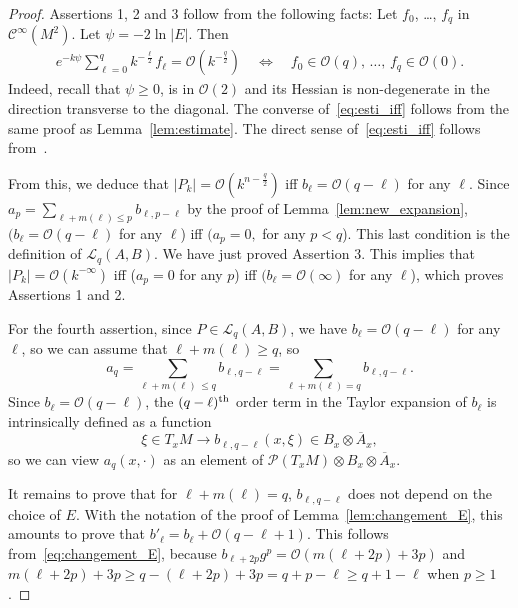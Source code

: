 \documentclass[10pt,a4paper]{article}
\theoremstyle{definition}
\numberwithin{equation}{section}
\newcommand{\con}{\overline}
\newcommand{\Ci}{{\mathcal{C}}^{\infty}}
\newcommand{\bigo}{\mathcal{O}}
\newcommand{\lag}{\mathcal{L}}
\newcommand{\pol}{\mathcal{P}}
\begin{document}
\begin{proof}
Assertions 1, 2 and 3 follow from the following facts: Let $f_0$, \ldots, $f_q$ in $\Ci (M^2)$. Let $\psi = -2
\ln |E|$. Then
\begin{gather}\label{eq:esti_iff}
e^{-k \psi} \sum_{\ell =0}^q k^{-\frac{\ell}{2}} f_{\ell} = \bigo \left(k^{-\frac{q}{2}}\right) \quad \Leftrightarrow \quad f_0 \in \bigo (q),\, \ldots,\, f_q \in \bigo (0).
\end{gather}
Indeed, recall that $\psi \geqslant 0 $, is in $\bigo (2)$ and its Hessian is non-degenerate in the direction transverse to the diagonal. The converse of~\eqref{eq:esti_iff} follows from the same proof as Lemma~\ref{lem:estimate}. The direct sense of~\eqref{eq:esti_iff} follows from~\cite[Proposition~2.4 and Remark~2.5]{oim}.


From this, we deduce that $|P_k | = \bigo (k^{n -\frac{q}{2}})$ iff $b_{\ell} = \bigo (q-\ell)$ for any $\ell$. Since $a_{p} = \sum_{\ell + m (\ell) \leqslant p} b_{\ell, p -\ell}$ by the proof of Lemma~\ref{lem:new_expansion}, $(b_\ell = \bigo (q-\ell)$ for any $\ell$) iff $(a_p = 0,$ for any $p < q$). This last condition is the definition of $\lag _q (A,B)$. We have just proved Assertion 3. This implies that $|P_k | =\bigo (k^{-\infty})$ iff ($a_{p} = 0$ for any $p$) iff $(b_{\ell} = \bigo(
\infty)$ for any $\ell$), which proves Assertions 1 and 2.

For the fourth assertion, since $P \in \lag_q(A,B)$, we have $b_{\ell} = \bigo (q-\ell)$ for any $\ell$, so we can assume that $\ell + m (\ell) \geqslant q$, so
\[
a_q =
\sum_{\ell + m (\ell) \,\leqslant q } b_{\ell, q- \ell} =\sum_{\ell + m (\ell
) = q } b_{\ell, q- \ell}.
\]
Since $b_{\ell} = \bigo (q-\ell)$, the $(q-\ell)^{\rm th}$ order term in the Taylor expansion of $b_{\ell}$ is intrinsically defined as a function
\[
\xi \in T_xM \rightarrow b_{\ell, q- \ell}
(x,\xi) \in B_x \otimes \con{A}_x,
\]
so we can view $a_q(x,\cdot)$ as an element
of $\pol (T_xM) \otimes B_x \otimes \con{A}_x$.

It remains to prove that for $\ell + m (\ell) =q$, $b_{\ell, q-\ell}$ does not depend on the choice of $E$. With the notation of the proof of Lemma~\ref{lem:changement_E}, this amounts to prove that $b'_{\ell} = b_{\ell} +
\bigo (q-\ell +1)$. This follows from~\eqref{eq:changement_E}, because $b_{\ell + 2p } g^p = \bigo (m (\ell+ 2 p) +3 p)$ and $m(\ell +2p) + 3p \geqslant q - (\ell+ 2p) + 3p = q + p - \ell \geqslant q + 1 -\ell$ when $p
\geqslant 1$.
\end{proof}
\end{document}
